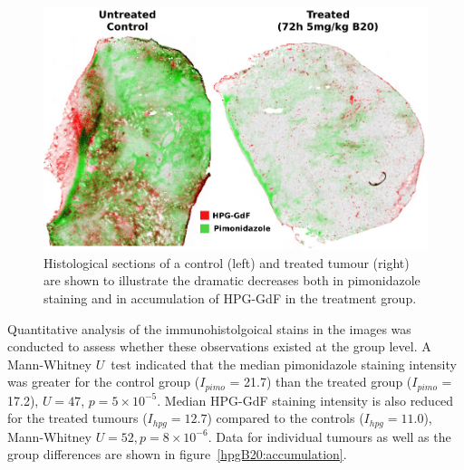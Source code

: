 \begin{figure}[htbp] %
  \centering
  \includegraphics[width=\textwidth]{hpg/hpg-B20-images/histo_hpgPimo.png} 
  \captionsetup{width=\linewidth}
  \caption{Histological sections of a control (left) and treated tumour (right) are shown to illustrate the dramatic decreases both in pimonidazole staining and in accumulation of \acs{HPG-GdF} in the treatment group.}
  \label{hpgB20:histohpgpimo}
\end{figure}

Quantitative analysis of the immunohistolgoical stains in the images was conducted to assess whether these observations existed at the group level. 
A Mann-Whitney $U$~test indicated that the median pimonidazole staining intensity was greater for the control group ($I_{pimo}$ = 21.7) than the treated group ($I_{pimo}$ = 17.2), $U = 47$, $p = 5\times10^{-5}$.
Median \acs{HPG-GdF} staining intensity is also reduced for the treated tumours ($I_{hpg} = 12.7$) compared to the controls ($I_{hpg} =11.0$), Mann-Whitney $U=52, p = 8\times10^{-6}$.
Data for individual tumours as well as the group differences are shown in figure~\ref{hpgB20:accumulation}.

